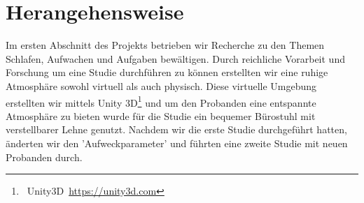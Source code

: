 \section{Herangehensweise}\label{sec:approach}

Im ersten Abschnitt des Projekts betrieben wir Recherche zu den Themen Schlafen, Aufwachen und Aufgaben bewältigen. Durch reichliche Vorarbeit und Forschung um eine Studie durchführen zu können erstellten wir eine ruhige Atmosphäre sowohl virtuell als auch physisch. Diese virtuelle Umgebung erstellten wir mittels Unity 3D\footnote{~Unity3D~\url{https://unity3d.com}} und um den Probanden eine entspannte Atmosphäre zu bieten wurde für die Studie ein bequemer Bürostuhl mit verstellbarer Lehne genutzt. Nachdem wir die erste Studie durchgeführt hatten, änderten wir den 'Aufweckparameter' und führten eine zweite Studie mit neuen Probanden durch. 
